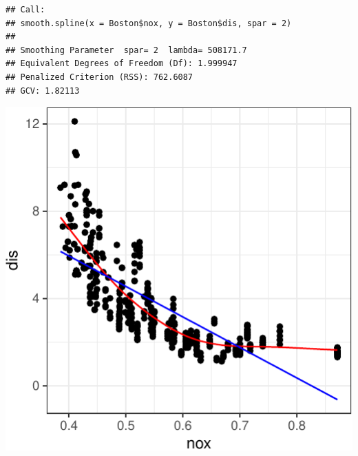 \documentclass[]{article}
\newenvironment{Shaded}{\begin{snugshade}}{\end{snugshade}}
\newcommand{\DataTypeTok}[1]{\textcolor[rgb]{0.13,0.29,0.53}{#1}}
\newcommand{\KeywordTok}[1]{\textcolor[rgb]{0.13,0.29,0.53}{\textbf{#1}}}
\newcommand{\NormalTok}[1]{#1}
\newcommand{\OperatorTok}[1]{\textcolor[rgb]{0.81,0.36,0.00}{\textbf{#1}}}
\newcommand{\StringTok}[1]{\textcolor[rgb]{0.31,0.60,0.02}{#1}}
\begin{document}
\begin{verbatim}
## Call:
## smooth.spline(x = Boston$nox, y = Boston$dis, spar = 2)
## 
## Smoothing Parameter  spar= 2  lambda= 508171.7
## Equivalent Degrees of Freedom (Df): 1.999947
## Penalized Criterion (RSS): 762.6087
## GCV: 1.82113
\end{verbatim}

\begin{Shaded}
\end{Shaded}

\begin{center}\includegraphics{sol_A4_files/figure-latex/unnamed-chunk-6-1} \end{center}
\end{document}
